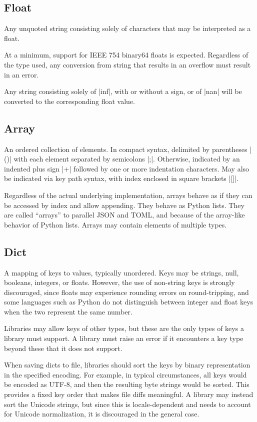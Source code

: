 \documentclass[11pt]{article}
\begin{document}
\subsection{Float}

Any unquoted string consisting solely of characters that may be interpreted as a float.  

At a minimum, support for IEEE 754 binary64 floats is expected.  Regardless of the type used, any conversion from string that results in an overflow must result in an error.

Any string consisting solely of |inf|, with or without a sign, or of |nan| will be converted to the corresponding float value.


\subsection{Array}

An ordered collection of elements.  In compact syntax, delimited by parentheses |()| with each element separated by semicolons |;|.  Otherwise, indicated by an indented plus sign |+| followed by one or more indentation characters.  May also be indicated via key path syntax, with index enclosed in square brackets |[]|.

Regardless of the actual underlying implementation, arrays behave as if they can be accessed by index and allow appending.  They behave as Python lists.  They are called ``arrays'' to parallel JSON and TOML, and because of the array-like behavior of Python lists.  Arrays may contain elements of multiple types.


\subsection{Dict}

A mapping of keys to values, typically unordered.  Keys may be strings, null, booleans, integers, or floats.  However, the use of non-string keys is strongly discouraged, since floats may experience rounding errors on round-tripping, and some languages such as Python do not distinguish between integer and float keys when the two represent the same number.

Libraries may allow keys of other types, but these are the only types of keys a library must support.  A library must raise an error if it encounters a key type beyond these that it does not support.

When saving dicts to file, libraries should sort the keys by binary representation in the specified encoding.  For example, in typical circumstances, all keys would be encoded as UTF-8, and then the resulting byte strings would be sorted.  This provides a fixed key order that makes file diffs meaningful.  A library may instead sort the Unicode strings, but since this is locale-dependent and needs to account for Unicode normalization, it is discouraged in the general case.
\end{document}

